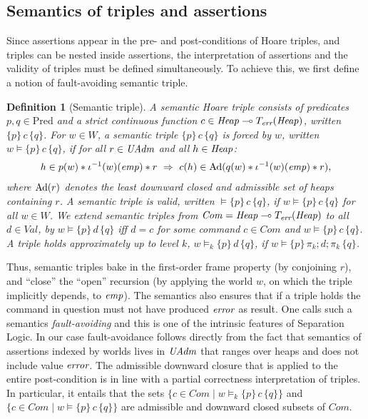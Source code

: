 \documentclass{LMCS}
\newtheorem{definition}[theorem]{Definition}
\theoremstyle{remark}
\newcommand{\Val}{\ensuremath{\mathit{Val}}\xspace}
\newcommand{\Com}{\ensuremath{\mathit{Com}}\xspace}
\newcommand{\ERR}{\ensuremath{\mbox{\it error}}\xspace}
\newcommand{\TERR}{\ensuremath{T_\textit{err}}\xspace}
\newcommand{\IMPLIES}{\ensuremath{\Rightarrow}}
\newcommand{\sto}{\ensuremath{\multimap}}
\newcommand{\triple}[3]{{\ensuremath{\!\left.\{ #1 \}\, #2\, \{  #3 \}\!\right.}}}
\newcommand{\wemp}{\textnormal{\textit{emp}}}
\newcommand{\Pred}{\ensuremath{\mathrm{Pred}}\xspace}
\newcommand{\W}{\ensuremath{W}}
\newcommand{\UNFOLD}{\ensuremath{\iota^{-1}}}
\begin{document}
\subsection{Semantics of triples and assertions}
\label{subsec:Assertion-Interpretation}

Since assertions appear in the pre- and post-conditions of Hoare triples, and triples can be nested inside assertions, the interpretation of assertions and the validity of triples must be defined simultaneously. To achieve this, we first define a notion of fault-avoiding semantic triple. 

\begin{definition}[Semantic triple] A \emph{semantic Hoare triple} consists of predicates  $p,q\in \Pred$ and a strict continuous function $c\in\Heap\sto\TERR(\Heap)$, written $\triple pcq$. For $w\in\W$, a semantic triple  $\triple pcq$ is \emph{forced by $w$}, written $w\models\triple{p}{c}{q}$, if for all $r\in \mathit{UAdm}$ and all $h\in\mathit{Heap}$:
\begin{align*}
h\in p(w) * \UNFOLD(w)(\wemp) *r\ \IMPLIES\ 
c(h)\in \DCl(q(w) * \UNFOLD(w)(\wemp) * r) ,  
\end{align*}
where $\mathrm{Ad}(r)$ denotes the least downward closed and admissible set of heaps containing $r$. 
A semantic triple is \emph{valid}, written $\models\triple pcq$, if $w\models\triple{p}{c}{q}$ for all $w\in\W$. We extend semantic triples from $\Com = \Heap\sto\TERR(\Heap)$ to all $d\in\Val$, by $w\models\triple{p}{d}{q}$ iff $d = c$ for some command $c\in\Com$ and $w\models\triple{p}{c}{q}$. \\
A triple holds \emph{approximately up to level $k$}, $w\models_k \triple{p}{d}{q}$, if $w\models \triple{p}{\pi_k;d;\pi_k}{q}$.
\end{definition}

Thus, semantic triples bake in the first-order frame property (by conjoining $r$), and ``close'' the ``open'' recursion (by applying the world $w$, on which the triple implicitly depends, to $\wemp$). The semantics also ensures that if a triple holds the command in question must not have produced $\ERR$ as result. One calls such a   semantics   \emph{fault-avoiding} and this is one of the intrinsic features of Separation Logic.  In our case fault-avoidance follows directly from the fact that semantics of assertions indexed by worlds lives in $\mathit{UAdm}$ that ranges over heaps and does not include value $\ERR$.
The admissible downward closure that is applied to the entire post-condition is in line with a partial correctness interpretation of triples. In particular, it entails that the sets 
$\{c\in\Com\;|\;w\models_k \triple{p}{c}{q}\}$ and $\{c\in\Com\;|\;w\models \triple{p}{c}{q}\}$ 
are admissible and downward closed subsets of $\Com$. 
\end{document}
